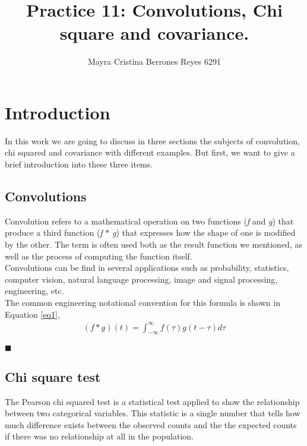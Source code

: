 \documentclass{article}
\begin{document}
\title{%
  Practice 11: Convolutions, Chi square and covariance. } %
\author{Mayra Cristina Berrones Reyes 6291}

\maketitle

\section{Introduction}

In this work we are going to discuss in three sections the subjects of convolution, chi squared and covariance with different examples. But first, we want to give a brief introduction into these three items.

\subsection{Convolutions}

Convolution refers to a mathematical operation on two functions (\textit{f} and \textit{g}) that produce a third function (\textit{f} $*$ \textit{g}) that expresses how the shape of one is modified by the other. The term is often used both as the result function we mentioned, as well as the process of computing the function itself.\\

Convolutions can be find in several applications such as probability, statistics, computer vision, natural language processing, image and signal processing, engineering, etc.\\

The common engineering notational convention for this formula is shown in Equation \ref{eq1}, 
 \begin{eqnarray}
\label{eq1}
(f*g)(t) = \int_{-\infty}^\infty f(\tau)g(t- \tau) d\tau 
\end{eqnarray}

\begin{flushright}
$\blacksquare$
\end{flushright}


\subsection{Chi square test}

The Pearson chi squared test is a statistical test applied to show the relationship between two categorical variables. This statistic is a single number that tells how much difference exists between the observed counts and the the expected counts if there was no relationship at all in the population.\\
\end{document}
